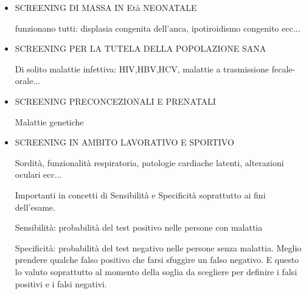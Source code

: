 \begin{itemize}
\item SCREENING DI MASSA IN Età NEONATALE

funzionano tutti: displasia congenita dell'anca, ipotiroidismo congenito
ecc...

\item SCREENING PER LA TUTELA DELLA POPOLAZIONE SANA

Di solito malattie infettiva: HIV,HBV,HCV, malattie a trasmissione
fecale-orale...

\item SCREENING PRECONCEZIONALI E PRENATALI

Malattie genetiche

\item SCREENING IN AMBITO LAVORATIVO E SPORTIVO

Sordità, funzionalità respiratoria, patologie cardiache latenti,
alterazioni oculari ecc...

Importanti in concetti di Sensibilità e Specificità soprattutto ai fini
dell'esame.

Sensibilità: probabilità del test positivo nelle persone con malattia

Specificità: probabilità del test negativo nelle persone senza malattia.
Meglio prendere qualche falso positivo che farsi sfuggire un falso
negativo. E questo lo valuto soprattutto al momento della soglia da
scegliere per definire i falsi positivi e i falsi negativi.
\end{itemize}

